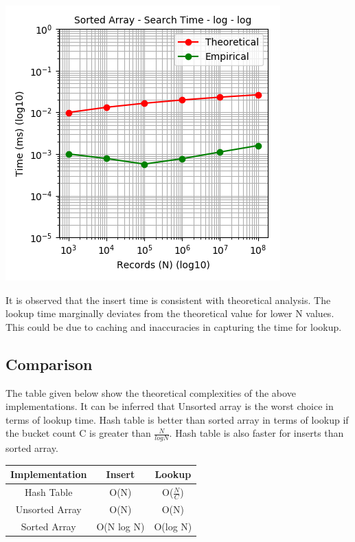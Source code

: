 \documentclass[11pt,a4paper,oneside]{article}
\begin{document}
	\begin{center}
		\includegraphics[scale=0.6]{6.png}		
	\end{center}
     
     It is observed that the insert time is consistent with theoretical analysis. The lookup time marginally deviates from the theoretical value for lower N values. This could be due to caching and inaccuracies in capturing the time for lookup.  
     
    \subsection{Comparison}
    The table given below show the theoretical complexities of the above implementations. It can be inferred that Unsorted array is the worst choice in terms of lookup time. Hash table is better than sorted array in terms of lookup if the bucket count C is greater than $\frac{N}{log N}$. Hash table is also faster for inserts than sorted array.
     \begin{center}
     	\begin{tabular}{|c|c|c|}
     		\hline 
     		\textbf{Implementation} & \textbf{Insert} & \textbf{Lookup} \\
     		\hline
     		Hash Table & O(N) & O($\frac{N}{C}$) \\ 
     		\hline 
     		Unsorted Array & O(N) & O(N)\\ 
     		\hline 
     		Sorted Array & O(N log N) & O(log N)\\ 
     		\hline 
     	\end{tabular}
     \end{center}
     
\end{document}

